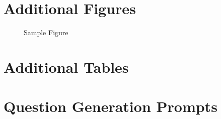 \documentclass[twoside, 11pt]{article}
\begin{document}
\begin{appendices}
    \section{Additional Figures} 
    \begin{figure}[htbp]
      \caption{Sample Figure} 
    \end{figure}

    \vp

    \section{Additional Tables}
    
    

    \vp

    \section{Question Generation Prompts} %
     \vp
     \vp
     \vp
     \vp
     \vp
     \vp


\end{appendices}
\end{document}
